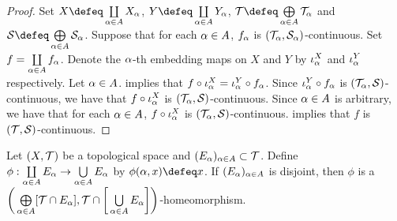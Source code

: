 \documentclass{book}
\begin{document}
	\begin{proof} 
		Set $X \defeq \coprod\limits_{\al \in A} X_{\al}$, $Y \defeq \coprod\limits_{\al \in A}Y_{\al}$, $\MT \defeq \bigoplus\limits_{\al \in A} \MT_{\al}$ and $\MS \defeq \bigoplus\limits_{\al \in A} \MS_{\al}$. Suppose that for each $\alpha \in A$, $f_{\alpha}$ is $(\mathcal{T}_{\alpha}, \mathcal{S}_{\alpha})$-continuous. Set $f = \coprod\limits_{\alpha \in A} f_{\alpha}$. Denote the $\alpha$-th embedding maps on $X$ and $Y$ by $\iota^X_{\alpha}$ and $\iota^Y_{\alpha}$ respectively. Let $\alpha \in A$.  implies that $f \circ \iota^X_{\alpha} = \iota^Y_{\alpha} \circ f_{\alpha}$. Since $\iota^Y_{\alpha} \circ f_{\alpha}$ is $(\mathcal{T}_{\alpha}, \mathcal{S})$-continuous, we have that $f \circ \iota^X_{\alpha}$ is $(\mathcal{T}_{\alpha}, \mathcal{S})$-continuous. Since $\alpha \in A$ is arbitrary, we have that for each $\alpha \in A$, $f \circ \iota^X_{\alpha}$ is $(\mathcal{T}_{\alpha}, \mathcal{S})$-continuous.  implies that $f$ is $(\mathcal{T}, \mathcal{S})$-continuous.
	\end{proof}
	
	\begin{ex} 
		Let $(X, \mathcal{T})$ be a topological space and $(E_{\alpha})_{\alpha \in A} \subset \mathcal{T}$. Define $\phi: \coprod\limits_{\alpha \in A} E_{\alpha} \rightarrow \bigcup\limits_{\alpha \in A} E_{\alpha}$ by $\phi(\al, x) \defeq x$. If $(E_{\alpha})_{\alpha \in A}$ is disjoint, then $\phi$ is a $\bigg( \bigoplus\limits_{\alpha \in A} [\mathcal{T} \cap E_{\alpha}], \mathcal{T} \cap \bigg[\bigcup\limits_{\alpha \in A} E_{\alpha} \bigg] \bigg)$-homeomorphism.
	\end{ex}
	
\end{document}
